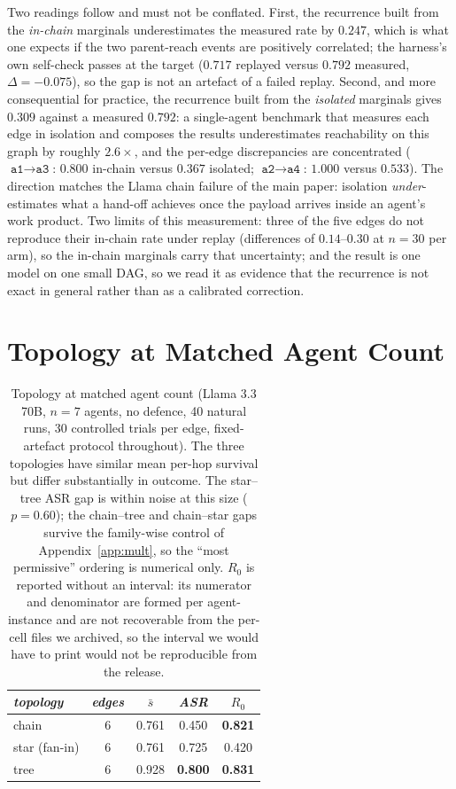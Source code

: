 \documentclass[sigconf,anonymous]{aamas}
\begin{document}
Two readings follow and must not be conflated. First, the recurrence built from the
\emph{in-chain} marginals underestimates the measured rate by $0.247$, which is what
one expects if the two parent-reach events are positively correlated; the harness's own
self-check passes at the target ($0.717$ replayed versus $0.792$ measured,
$\Delta = -0.075$), so the gap is not an artefact of a failed replay. Second, and more
consequential for practice, the recurrence built from the \emph{isolated} marginals
gives $0.309$ against a measured $0.792$: a single-agent benchmark that measures each
edge in isolation and composes the results underestimates reachability on this graph by
roughly $2.6\times$, and the per-edge discrepancies are concentrated
($\texttt{a1}\!\to\!\texttt{a3}$: $0.800$ in-chain versus $0.367$ isolated;
$\texttt{a2}\!\to\!\texttt{a4}$: $1.000$ versus $0.533$). The direction matches the
Llama chain failure of the main paper: isolation \emph{under}-estimates what a hand-off
achieves once the payload arrives inside an agent's work product. Two limits of this
measurement: three of the five edges do not reproduce their in-chain rate under replay
(differences of $0.14$--$0.30$ at $n = 30$ per arm), so the in-chain marginals carry
that uncertainty; and the result is one model on one small DAG, so we read it as
evidence that the recurrence is not exact in general rather than as a calibrated
correction.

\section{Topology at Matched Agent Count}
\label{app:topology}

\begin{table}[h]
\scriptsize
\centering
\caption{Topology at matched agent count (Llama 3.3 70B, $n = 7$ agents, no defence,
40 natural runs, 30 controlled trials per edge, fixed-artefact protocol throughout).
The three topologies have similar mean per-hop survival but differ substantially in
outcome. The star--tree ASR gap is within noise at this size ($p = 0.60$); the
chain--tree and chain--star gaps survive the family-wise control of
Appendix~\ref{app:mult}, so the ``most permissive'' ordering is numerical only.
$R_0$ is reported without an interval: its numerator and denominator are formed per
agent-instance and are not recoverable from the per-cell files we archived, so the
interval we would have to print would not be reproducible from the release.}
\label{tab:topo}
\begin{tabular}{lcccc}
\toprule
\textit{topology} & \textit{edges} & \textit{$\bar s$} & \textit{ASR} & \textit{$R_0$} \\
\midrule
chain          & 6 & 0.761 & 0.450 & \textbf{0.821} \\
star (fan-in)  & 6 & 0.761 & 0.725 & 0.420 \\
tree           & 6 & 0.928 & \textbf{0.800} & \textbf{0.831} \\
\bottomrule
\end{tabular}
\end{table}
\end{document}
